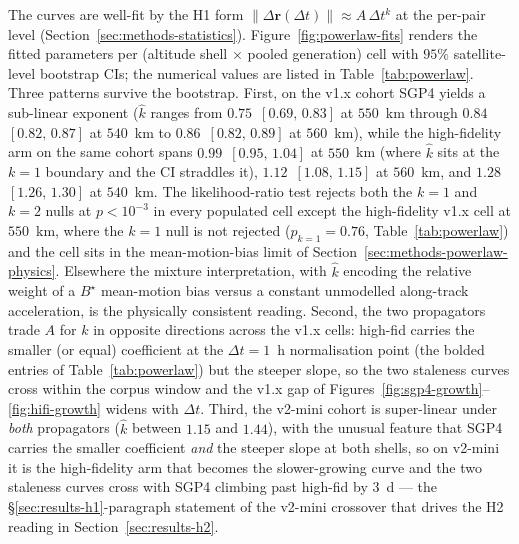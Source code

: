\documentclass[10pt, letterpaper]{article}
\begin{document}
The curves are well-fit by the H1 form
$\lVert\Delta\mathbf{r}(\Delta t)\rVert \approx A\,\Delta t^{k}$ at
the per-pair level (Section~\ref{sec:methods-statistics}).
Figure~\ref{fig:powerlaw-fits} renders the fitted parameters per
(altitude shell $\times$ pooled generation) cell with $95\%$
satellite-level bootstrap CIs; the numerical values are listed in
Table~\ref{tab:powerlaw}. Three patterns survive the bootstrap.
First, on the v1.x cohort SGP4 yields a sub-linear exponent
($\hat k$ ranges from $0.75$~$[0.69,\,0.83]$ at $550$~km through
$0.84$~$[0.82,\,0.87]$ at $540$~km to $0.86$~$[0.82,\,0.89]$ at
$560$~km), while the high-fidelity arm on the same cohort spans
$0.99$~$[0.95,\,1.04]$ at $550$~km (where $\hat k$ sits at the
$k=1$ boundary and the CI straddles it), $1.12$~$[1.08,\,1.15]$
at $560$~km, and $1.28$~$[1.26,\,1.30]$ at $540$~km. The likelihood-ratio test
rejects both the $k = 1$ and $k = 2$ nulls at $p < 10^{-3}$ in every
populated cell except the high-fidelity v1.x cell at $550$~km, where
the $k=1$ null is not rejected ($p_{k=1} = 0.76$,
Table~\ref{tab:powerlaw}) and the cell sits in the mean-motion-bias
limit of Section~\ref{sec:methods-powerlaw-physics}. Elsewhere the
mixture interpretation, with $\hat k$ encoding the relative weight
of a $B^{\!\star}$ mean-motion bias versus a constant unmodelled
along-track acceleration, is the physically consistent reading.
Second, the two propagators trade $A$ for $k$ in opposite directions
across the v1.x cells: high-fid carries the smaller (or equal)
coefficient at the $\Delta t = 1$~h normalisation point (the
bolded entries of Table~\ref{tab:powerlaw}) but the steeper slope,
so the two staleness curves cross within the corpus window and the
v1.x gap of Figures~\ref{fig:sgp4-growth}--\ref{fig:hifi-growth}
widens with $\Delta t$. Third, the v2-mini cohort is super-linear
under \emph{both} propagators ($\hat k$ between $1.15$ and $1.44$),
with the unusual feature that SGP4 carries the smaller coefficient
\emph{and} the steeper slope at both shells, so on v2-mini it is the
high-fidelity arm that becomes the slower-growing curve and the two
staleness curves cross with SGP4 climbing past high-fid by $3$~d ---
the §\ref{sec:results-h1}-paragraph statement of the v2-mini
crossover that drives the H2 reading in
Section~\ref{sec:results-h2}.
\end{document}
